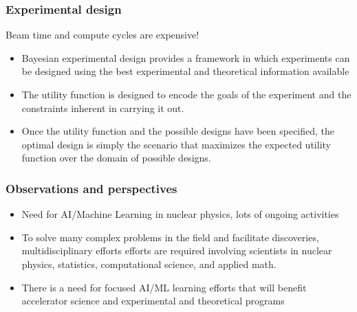 \documentclass{beamer}
\begin{document}
\begin{frame}
\frametitle{Experimental design}

Beam time and compute cycles are expensive!

\begin{itemize}
\item Bayesian experimental design provides a framework in which experiments can be designed using the best experimental and theoretical information available 

\item The utility function is designed to encode the goals of the experiment and the constraints inherent in carrying it out. 

\item Once the utility function and the possible designs have been specified, the optimal design is simply the scenario that  maximizes the expected utility function over the domain of possible designs.
\end{itemize}

\noindent
\end{frame}

\begin{frame}
\frametitle{Observations and perspectives}

\begin{block}{}
\begin{itemize}
\item Need for AI/Machine Learning in nuclear physics, lots of ongoing activities

\item To solve many complex problems in the field and facilitate discoveries, multidisciplinary efforts efforts are required involving scientists in  nuclear physics, statistics, computational science, and applied math.

\item There is a need for  focused AI/ML learning efforts that will benefit accelerator science and experimental and theoretical programs
\end{itemize}

\noindent
\end{block}
\end{frame}
\end{document}
